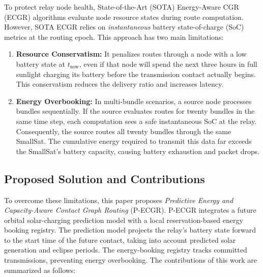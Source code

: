 \documentclass[journal,twocolumn]{IEEEtran}
\newcommand{\ecgr}{\textsf{ECGR}}
\newcommand{\pecgr}{\textsf{P-ECGR}}
\begin{document}
To protect relay node health, State-of-the-Art (SOTA) Energy-Aware CGR (\ecgr{}) algorithms evaluate node resource states during route computation. However, SOTA \ecgr{} relies on \emph{instantaneous} battery state-of-charge (SoC) metrics at the routing epoch. This approach has two main limitations:
\begin{enumerate}
    \item \textbf{Resource Conservatism:} It penalizes routes through a node with a low battery state at $t_{\text{now}}$, even if that node will spend the next three hours in full sunlight charging its battery before the transmission contact actually begins. This conservatism reduces the delivery ratio and increases latency.
    \item \textbf{Energy Overbooking:} In multi-bundle scenarios, a source node processes bundles sequentially. If the source evaluates routes for twenty bundles in the same time step, each computation sees a safe instantaneous SoC at the relay. Consequently, the source routes all twenty bundles through the same SmallSat. The cumulative energy required to transmit this data far exceeds the SmallSat's battery capacity, causing battery exhaustion and packet drops.
\end{enumerate}

\subsection{Proposed Solution and Contributions}
To overcome these limitations, this paper proposes \emph{Predictive Energy and Capacity-Aware Contact Graph Routing} (\pecgr{}). \pecgr{} integrates a future orbital solar-charging prediction model with a local reservation-based energy booking registry. The prediction model projects the relay's battery state forward to the start time of the future contact, taking into account predicted solar generation and eclipse periods. The energy-booking registry tracks committed transmissions, preventing energy overbooking. The contributions of this work are summarized as follows:
\end{document}
